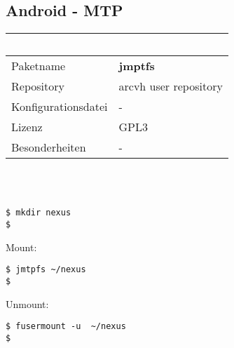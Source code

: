 \subsection{Android - MTP}
\begin{tabular}{l|l}
~ \\ \hline
Paketname & \textbf{jmptfs} \\ 
Repository & arcvh user repository\\
Konfigurationsdatei & - \\
Lizenz & GPL3 \\
Besonderheiten & - \\
\end{tabular}
\\ \\
\begin{lstlisting}[style=Bash]
$ mkdir nexus 
$
\end{lstlisting}
Mount: 
\begin{lstlisting}[style=Bash]
$ jmtpfs ~/nexus
$
\end{lstlisting}
Unmount: 
\begin{lstlisting}[style=Bash]
$ fusermount -u  ~/nexus
$
\end{lstlisting}
